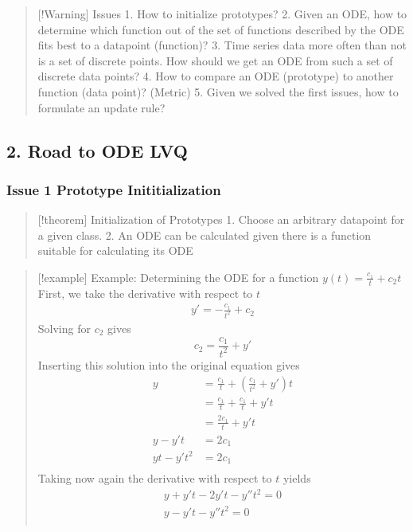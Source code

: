 \documentclass[
]{article}
\begin{document}
\begin{quote}
{[}!Warning{]} Issues 1. How to initialize prototypes? 2. Given an ODE,
how to determine which function out of the set of functions described by
the ODE fits best to a datapoint (function)? 3. Time series data more
often than not is a set of discrete points. How should we get an ODE
from such a set of discrete data points? 4. How to compare an ODE
(prototype) to another function (data point)? (Metric) 5. Given we
solved the first issues, how to formulate an update rule?
\end{quote}

\subsection{2. Road to ODE LVQ}\label{road-to-ode-lvq}

\subsubsection{Issue 1 Prototype
Inititialization}\label{issue-1-prototype-inititialization}

\begin{quote}
{[}!theorem{]} Initialization of Prototypes 1. Choose an arbitrary
datapoint for a given class. 2. An ODE can be calculated given there is
a function suitable for calculating its ODE
\end{quote}

\begin{quote}
{[}!example{]} Example: Determining the ODE for a function
\(y(t)=\frac{c_{1}}{t}+c_{2}t\) First, we take the derivative with
respect to \(t\) \[\begin{align}
y' = -\frac{c_{1}}{t^2}+c_{2}
\end{align}\] Solving for \(c_2\) gives \[c_{2} = \frac{c_{1}}{t^2}+y'\]
Inserting this solution into the original equation gives \[\begin{align}
y &= \frac{c_{1}}{t}+ \left( \frac{c_{1}}{t^2}+y' \right)t \\
  &= \frac{c_{1}}{t}+ \frac{c_{1}}{t}+y't \\
  &= \frac{2c_{1}}{t}+y't \\
y-y't  &= 2c_{1}\\ 
yt-y't^2  &= 2c_{1} \\ 
\end{align}\] Taking now again the derivative with respect to \(t\)
yields \[\begin{align}
y+y't-2y't-y''t^2 = 0 \\
y-y't-y''t^2 = 0 \\
\end{align}\]
\end{quote}
\end{document}
